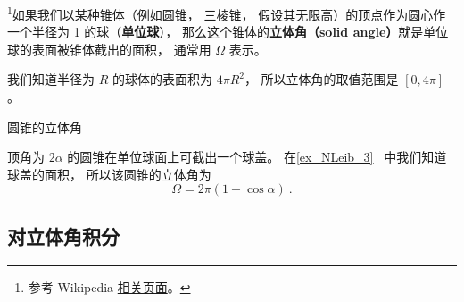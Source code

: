 
\begin{issues}
\issueTODO
\end{issues}


\footnote{参考 Wikipedia \href{https://en.wikipedia.org/wiki/Solid_angle}{相关页面}。}如果我们以某种锥体（例如圆锥， 三棱锥， 假设其无限高）的顶点作为圆心作一个半径为 1 的球（\textbf{单位球}）， 那么这个锥体的\textbf{立体角（solid angle）}就是单位球的表面被锥体截出的面积， 通常用 $\Omega$ 表示。

我们知道半径为 $R$ 的球体的表面积为 $4\pi R^2$， 所以立体角的取值范围是 $[0, 4\pi]$。

\begin{example}{圆锥的立体角}

顶角为 $2\alpha$ 的圆锥在单位球面上可截出一个球盖。 在\autoref{ex_NLeib_3}~ 中我们知道球盖的面积， 所以该圆锥的立体角为
\begin{equation}
\Omega = 2\pi (1 - \cos\alpha)~.
\end{equation}
\end{example}

\subsection{对立体角积分}
